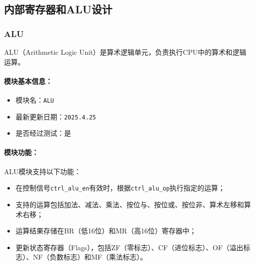 \documentclass[lang=cn,a4paper,newtx]{elegantpaper}
\begin{document}
\subsection{内部寄存器和ALU设计}
\subsubsection{ALU}
ALU（Arithmetic Logic Unit）是算术逻辑单元，负责执行CPU中的算术和逻辑运算。

\paragraph{模块基本信息：}
\begin{itemize}
  \item 模块名：\texttt{ALU}
  \item 最新更新日期：\texttt{2025.4.25}
  \item 是否经过测试：是
\end{itemize}

\paragraph{模块功能：}
ALU模块支持以下功能：
\begin{itemize}
  \item 在控制信号\texttt{ctrl\_alu\_en}有效时，根据\texttt{ctrl\_alu\_op}执行指定的运算；
  \item 支持的运算包括加法、减法、乘法、按位与、按位或、按位非、算术左移和算术右移；
  \item 运算结果存储在BR（低16位）和MR（高16位）寄存器中；
  \item 更新状态寄存器（Flags），包括ZF（零标志）、CF（进位标志）、OF（溢出标志）、NF（负数标志）和MF（乘法标志）。
\end{itemize}
\end{document}

